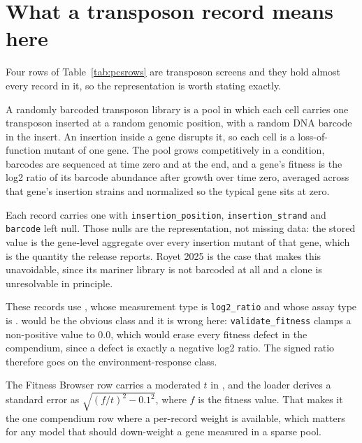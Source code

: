 
\section{What a transposon record means here}\label{sec:transposon}

Four rows of Table~\ref{tab:pcsrows} are transposon screens and they hold almost every
record in it, so the representation is worth stating exactly.

 A randomly barcoded transposon library is a pool in which
each cell carries one transposon inserted at a random genomic position, with a random
DNA barcode in the insert. An insertion inside a gene disrupts it, so each cell is a
loss-of-function mutant of one gene. The pool grows competitively in a condition,
barcodes are sequenced at time zero and at the end, and a gene's fitness is the log2
ratio of its barcode abundance after growth over time zero, averaged across that gene's
insertion strains and normalized so the typical gene sits at zero.

 Each record carries one
 with \texttt{insertion\_position},
\texttt{insertion\_strand} and \texttt{barcode} left null. Those nulls are the
representation, not missing data: the stored value is the gene-level aggregate over
every insertion mutant of that gene, which is the quantity the release reports. Royet
2025 is the case that makes this unavoidable, since its mariner library is not barcoded
at all and a clone is unresolvable in principle.

 These records use
, whose measurement type is \texttt{log2\_ratio} and
whose assay type is .
 would be the obvious class and it is wrong here:
\texttt{validate\_fitness} clamps a non-positive value to 0.0, which would erase every
fitness defect in the compendium, since a defect is exactly a negative log2 ratio. The
signed ratio therefore goes on the environment-response class.

 The Fitness Browser row carries a
moderated $t$ in , and the loader derives a
standard error as $\sqrt{(f/t)^2 - 0.1^2}$, where $f$ is the fitness value. That makes
it the one compendium row where a per-record weight is available, which matters for any
model that should down-weight a gene measured in a sparse pool.

